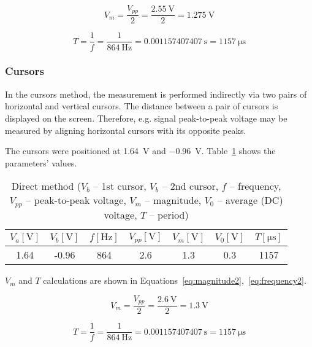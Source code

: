 \begin{equation}
	V_{m} = \frac{V_{pp}}{2} = \frac{\SI{2.55}{\volt}}{2} = \SI{1.275}{\volt}
	\label{eq:magnitude}
\end{equation}

\begin{equation}
	T = \frac{1}{f} = \frac{1}{\SI{864}{\hertz}} = \SI{0.001157407407}{\second} = \SI{1157}{\micro\second}
	\label{eq:frequency}
\end{equation}

\subsubsection*{Cursors}

In the cursors method, the measurement is performed indirectly via two pairs of horizontal and vertical cursors. The distance between a pair of cursors is displayed on the screen. Therefore, e.g. signal peak-to-peak voltage may be measured by aligning horizontal cursors with its opposite peaks.

The cursors were positioned at \SI{1.64}{\volt} and \SI{-0.96}{\volt}. Table~\ref{tab:cursors-method} shows the parameters' values.

\begin{table}[H]
	\centering
	\begin{tabular}{c|c|c|c|c|c|c}
		$V_{a} [\unit\volt]$ & $V_{b} [\unit\volt]$ & $f [\unit{\hertz}]$ & $V_{pp} [\unit{\volt}]$ & $V_{m} [\unit{\volt}]$ & $V_{0} [\unit{\volt}]$ & $T [\unit{\micro\second}]$\\
		\hline
		1.64 & -0.96 & 864 & 2.6 & 1.3 & 0.3 & 1157
	\end{tabular}
	\caption{Direct method ($V_{b}$ -- 1st cursor, $V_{b}$ -- 2nd cursor, $f$ -- frequency, $V_{pp}$ -- peak-to-peak voltage, $V_{m}$ -- magnitude, $V_{0}$ -- average (DC) voltage, $T$ -- period)}
	\label{tab:cursors-method}
\end{table}

$V_{m}$ and $T$ calculations are shown in Equations~\ref{eq:magnitude2},~\ref{eq:frequency2}.

\begin{equation}
	V_{m} = \frac{V_{pp}}{2} = \frac{\SI{2.6}{\volt}}{2} = \SI{1.3}{\volt}
	\label{eq:magnitude2}
\end{equation}

\begin{equation}
	T = \frac{1}{f} = \frac{1}{\SI{864}{\hertz}} = \SI{0.001157407407}{\second} = \SI{1157}{\micro\second}
	\label{eq:frequency2}
\end{equation}


